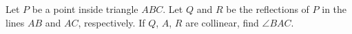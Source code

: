 Let $P$ be a point inside triangle $ABC$. Let $Q$ and $R$ be the reflections of $P$ in the lines $AB$ and $AC$, respectively. If $Q$, $A$, $R$ are collinear, find $\angle BAC$.
